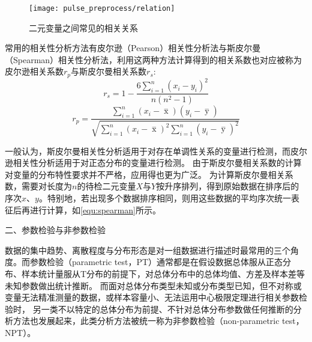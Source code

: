\begin{figure}[htbp]
    \centering
    \texttt{[image: pulse\_preprocess/relation]}
    \caption[二元变量之间常见的相关关系]{\label{fig:relation}二元变量之间常见的相关关系\cite{IXL2022}}
\end{figure}

常用的相关性分析方法有皮尔逊（Pearson）相关性分析法与斯皮尔曼（Spearman）相关性分析法，利用这两种方法计算得到的相关系数也对应被称为皮尔逊相关系数$r_p$与斯皮尔曼相关系数$r_s$:
\begin{equation}
    \label{equ:spearman}
    r_s=1-\frac{6\sum_{i=1}^{n}(x_{i}-y_{i})^2}{n(n^2-1)}
\end{equation}
\begin{equation}
    \label{equ:pearson}
    r_p=\frac{\sum_{i=1}^n{(x_i- \mathop{x} \limits^-)(y_i- \mathop{y} \limits^-)}}{\sqrt{{\sum_{i=1}^n}{{(x_i- \mathop{x} \limits^-)^2\sum_{i=1}^n}{(y_i- \mathop{y} \limits^-)^2}}}}
\end{equation}

一般认为，斯皮尔曼相关性分析适用于对存在单调性关系的变量进行检测，而皮尔逊相关性分析适用于对正态分布的变量进行检测。
由于斯皮尔曼相关系数的计算对变量的分布特性要求并不严格，应用得也更为广泛。
为计算斯皮尔曼相关系数，需要对长度为$n$的待检二元变量$X$与$Y$按升序排列，得到原始数据在排序后的序次$x$、$y$。特别地，若出现多个数据排序相同，则用这些数据的平均序次统一表征后再进行计算，如\autoref{equ:spearman}所示。

二、参数检验与非参数检验

数据的集中趋势、离散程度与分布形态是对一组数据进行描述时最常用的三个角度\cite{Hu2021}。而参数检验（parametric test，PT）通常都是在假设数据总体服从正态分布、样本统计量服从T分布的前提下，对总体分布中的总体均值、方差及样本差等未知参数做出统计推断。
而面对总体分布类型未知或分布类型已知，但不对称或变量无法精准测量的数据，或样本容量小、无法运用中心极限定理进行相关参数检验时，
另一类不以特定的总体分布为前提、不针对总体分布参数做任何推断的分析方法也发展起来，此类分析方法被统一称为非参数检验（non-parametric test，NPT）\cite{Guo2017,Hu2021,Zhang2019}。

